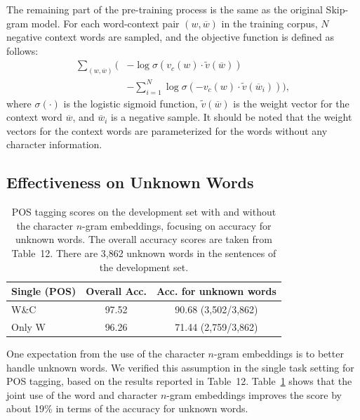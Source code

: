 \documentclass[11pt,a4paper]{article}
\begin{document}
The remaining part of the pre-training process is the same as the original Skip-gram model.
For each word-context pair $(w, \overline{w})$ in the training corpus, $N$ negative context words are sampled, and the objective function is defined as follows:
\begin{equation}
\begin{split}
\sum_{(w, \overline{w})}\biggl(&-\log{\sigma(v_c(w)\cdot \tilde{v}(\overline{w}))}\\
&-\sum_{i=1}^{N}\log{\sigma(-v_c(w)\cdot \tilde{v}(\overline{w}_i))}\biggr),
\end{split}
\end{equation}
where $\sigma(\cdot)$ is the logistic sigmoid function, $\tilde{v}(\overline{w})$ is the weight vector for the context word $\overline{w}$, and $\overline{w}_i$ is a negative sample.
It should be noted that the weight vectors for the context words are parameterized for the words without any character information.


\subsection{Effectiveness on Unknown Words}
\begin{table}[t]
  \begin{center}
	\begin{tabular}{l|c|c}
  	Single (POS) & Overall Acc. & Acc. for unknown words \\ \hline
    W\&C         & 97.52 & 90.68 (3,502/3,862) \\ \hline
    Only W       & 96.26 & 71.44 (2,759/3,862) \\ \hline
  \end{tabular}
    \caption{POS tagging scores on the development set with and without the character $n$-gram embeddings, focusing on accuracy for unknown words.
    	     The overall accuracy scores are taken from Table~12.
             There are 3,862 unknown words in the sentences of the development set.}
    \label{tb:pos_unk}
  \end{center}
\end{table}

One expectation from the use of the character $n$-gram embeddings is to better handle unknown words.
We verified this assumption in the single task setting for POS tagging, based on the results reported in Table~12.
Table~\ref{tb:pos_unk} shows that the joint use of the word and character $n$-gram embeddings improves the score by about 19\% in terms of the accuracy for unknown words.
\end{document}
